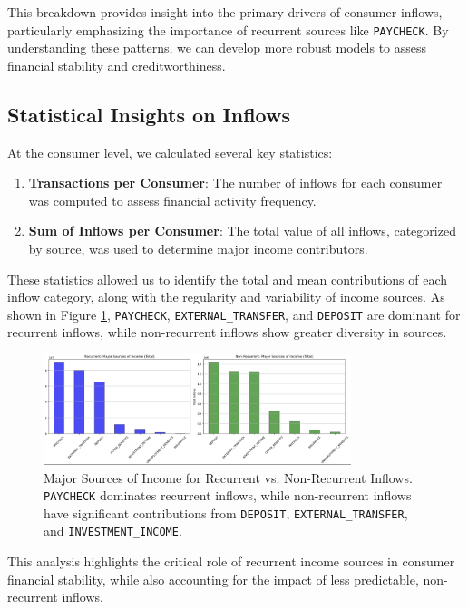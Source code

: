 \documentclass[12pt,letterpaper]{article}
\begin{document}
This breakdown provides insight into the primary drivers of consumer inflows, particularly emphasizing the importance of recurrent sources like \texttt{PAYCHECK}. By understanding these patterns, we can develop more robust models to assess financial stability and creditworthiness.

\subsection{Statistical Insights on Inflows}
At the consumer level, we calculated several key statistics:
\begin{enumerate}
    \item \textbf{Transactions per Consumer}: The number of inflows for each consumer was computed to assess financial activity frequency.
    \item \textbf{Sum of Inflows per Consumer}: The total value of all inflows, categorized by source, was used to determine major income contributors.
\end{enumerate}

These statistics allowed us to identify the total and mean contributions of each inflow category, along with the regularity and variability of income sources. As shown in Figure \ref{fig:recurrent_vs_non_recurrent}, \texttt{PAYCHECK}, \texttt{EXTERNAL\_TRANSFER}, and \texttt{DEPOSIT} are dominant for recurrent inflows, while non-recurrent inflows show greater diversity in sources.

\begin{figure}[H]
    \centering
    \includegraphics[width=0.8\textwidth]{figure/recurrent_vs_non_recurrent}
    \caption{Major Sources of Income for Recurrent vs. Non-Recurrent Inflows. \texttt{PAYCHECK} dominates recurrent inflows, while non-recurrent inflows have significant contributions from \texttt{DEPOSIT}, \texttt{EXTERNAL\_TRANSFER}, and \texttt{INVESTMENT\_INCOME}.}
    \label{fig:recurrent_vs_non_recurrent}
\end{figure}

This analysis highlights the critical role of recurrent income sources in consumer financial stability, while also accounting for the impact of less predictable, non-recurrent inflows.
\end{document}
